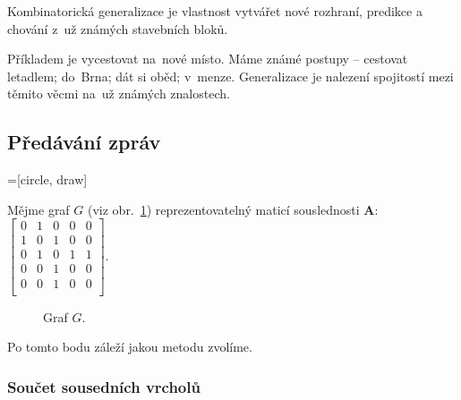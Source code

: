 Kombinatorická generalizace je vlastnost vytvářet nové rozhraní, predikce a chování z~už známých stavebních bloků.

Příkladem je vycestovat na~nové místo.
Máme známé postupy -- cestovat letadlem; do~Brna; dát si oběd; v~menze.
Generalizace je nalezení spojitostí mezi těmito věcmi na~už známých znalostech.

\subsection{Předávání zpráv}
=[circle, draw]

Mějme graf $G$ (viz obr.~\ref{graf-pro-predavani-zprav}) reprezentovatelný maticí souslednosti $\mathbf{A}$: 
$\left[ \begin{matrix}
0 & 1 & 0 & 0 & 0 \\
1 & 0 & 1 & 0 & 0 \\
0 & 1 & 0 & 1 & 1 \\
0 & 0 & 1 & 0 & 0 \\
0 & 0 & 1 & 0 & 0 \\
\end{matrix} \right]$.

\begin{figure}[ht]
    \centering
    \caption{Graf $G$.}
    \label{graf-pro-predavani-zprav}
\end{figure}
\FloatBarrier

Po tomto bodu záleží jakou metodu zvolíme.

\subsubsection{Součet sousedních vrcholů}

